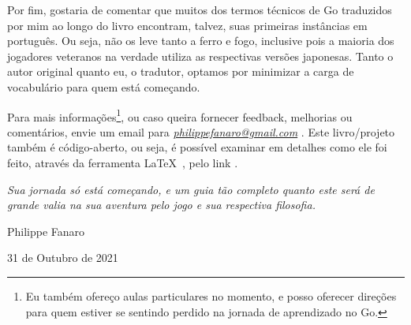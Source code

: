 \pagebreak

Por fim, gostaria de comentar que muitos dos termos técnicos de Go traduzidos por mim ao longo do livro encontram, talvez, suas primeiras instâncias em português. Ou seja, não os leve tanto a ferro e fogo, inclusive pois a maioria dos jogadores veteranos na verdade utiliza as respectivas versões japonesas. Tanto o autor original quanto eu, o tradutor, optamos por minimizar a carga de vocabulário para quem está começando.

\bigskip
\bigskip

Para mais informações\footnote{Eu também ofereço aulas particulares no momento, e posso oferecer direções para quem estiver se sentindo perdido na jornada de aprendizado no Go.}, ou caso queira fornecer feedback, melhorias ou comentários, envie um email para \emph{\href{mailto:philippefanaro@gmail.com}{philippefanaro@gmail.com}} \cite{fanaro_email}. Este livro/projeto também é código-aberto, ou seja, é possível examinar em detalhes como ele foi feito, através da ferramenta \LaTeX~\cite{latex}, pelo link \href{https://github.com/FanaroEngineering/traducao_como_jogar_go}{}\cite{repo_github}.

\bigskip
\bigskip

\emph{Sua jornada só está começando, e um guia tão completo quanto este será de grande valia na sua aventura pelo jogo e sua respectiva filosofia.}

\bigskip
\bigskip

Philippe Fanaro

31 de Outubro de 2021